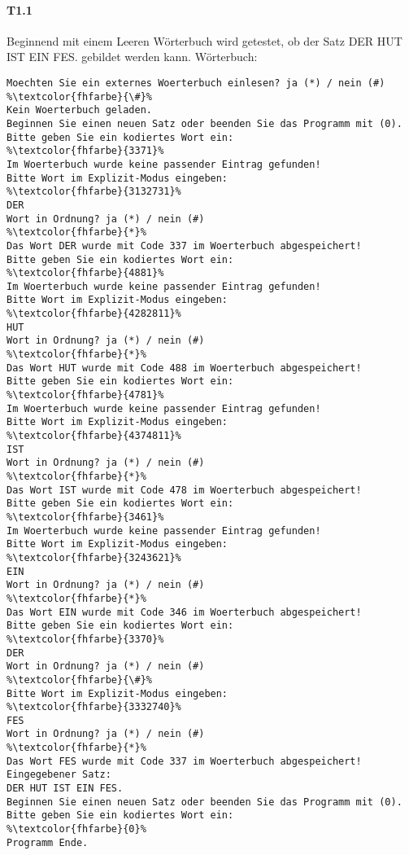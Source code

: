 \paragraph*{T1.1}
Beginnend mit einem Leeren Wörterbuch wird getestet, ob der Satz \glqq DER HUT IST EIN FES.\grqq{} gebildet werden kann.
Wörterbuch:
\begin{lstlisting}[escapechar=\%]
Moechten Sie ein externes Woerterbuch einlesen? ja (*) / nein (#)
%\textcolor{fhfarbe}{\#}%
Kein Woerterbuch geladen.
Beginnen Sie einen neuen Satz oder beenden Sie das Programm mit (0).
Bitte geben Sie ein kodiertes Wort ein:
%\textcolor{fhfarbe}{3371}%
Im Woerterbuch wurde keine passender Eintrag gefunden!
Bitte Wort im Explizit-Modus eingeben:
%\textcolor{fhfarbe}{3132731}%
DER
Wort in Ordnung? ja (*) / nein (#)
%\textcolor{fhfarbe}{*}%
Das Wort DER wurde mit Code 337 im Woerterbuch abgespeichert!
Bitte geben Sie ein kodiertes Wort ein:
%\textcolor{fhfarbe}{4881}%
Im Woerterbuch wurde keine passender Eintrag gefunden!
Bitte Wort im Explizit-Modus eingeben:
%\textcolor{fhfarbe}{4282811}%
HUT
Wort in Ordnung? ja (*) / nein (#)
%\textcolor{fhfarbe}{*}%
Das Wort HUT wurde mit Code 488 im Woerterbuch abgespeichert!
Bitte geben Sie ein kodiertes Wort ein:
%\textcolor{fhfarbe}{4781}%
Im Woerterbuch wurde keine passender Eintrag gefunden!
Bitte Wort im Explizit-Modus eingeben:
%\textcolor{fhfarbe}{4374811}%
IST
Wort in Ordnung? ja (*) / nein (#)
%\textcolor{fhfarbe}{*}%
Das Wort IST wurde mit Code 478 im Woerterbuch abgespeichert!
Bitte geben Sie ein kodiertes Wort ein:
%\textcolor{fhfarbe}{3461}%
Im Woerterbuch wurde keine passender Eintrag gefunden!
Bitte Wort im Explizit-Modus eingeben:
%\textcolor{fhfarbe}{3243621}%
EIN
Wort in Ordnung? ja (*) / nein (#)
%\textcolor{fhfarbe}{*}%
Das Wort EIN wurde mit Code 346 im Woerterbuch abgespeichert!
Bitte geben Sie ein kodiertes Wort ein:
%\textcolor{fhfarbe}{3370}%
DER
Wort in Ordnung? ja (*) / nein (#)
%\textcolor{fhfarbe}{\#}%
Bitte Wort im Explizit-Modus eingeben:
%\textcolor{fhfarbe}{3332740}%
FES
Wort in Ordnung? ja (*) / nein (#)
%\textcolor{fhfarbe}{*}%
Das Wort FES wurde mit Code 337 im Woerterbuch abgespeichert!
Eingegebener Satz:
DER HUT IST EIN FES.
Beginnen Sie einen neuen Satz oder beenden Sie das Programm mit (0).
Bitte geben Sie ein kodiertes Wort ein:
%\textcolor{fhfarbe}{0}%
Programm Ende.
\end{lstlisting}

\begin{center}
    \label{fig:wbuch1}
\end{center}
